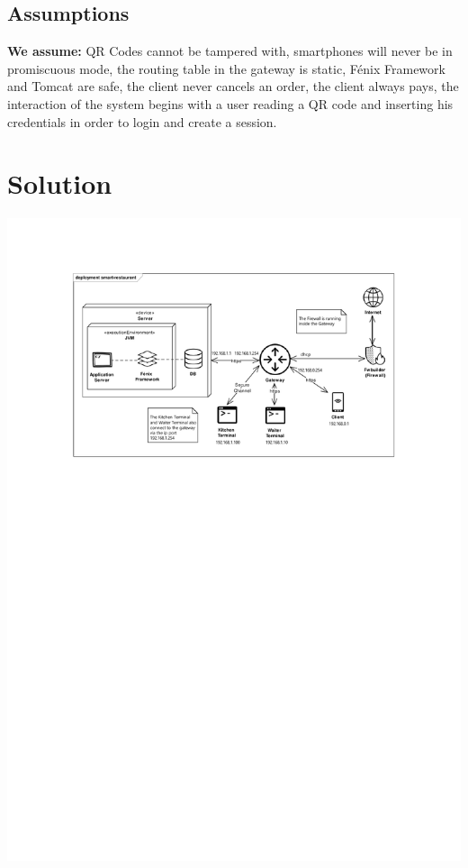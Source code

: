 \documentclass[12pt,paper=a4]{article}
\begin{document}
\subsection{Assumptions}
\textbf{We assume:} QR Codes cannot be tampered with, smartphones will never be in promiscuous mode, the routing table in the gateway is static, Fénix Framework and Tomcat are safe, the client never cancels an order, the client always pays, the interaction of the system begins with a user reading a QR code and inserting his credentials in order to login and create a session.

\section{Solution}

\includegraphics[trim=3.1cm 18cm 0 2cm]{Diagrama.pdf}
\end{document}
